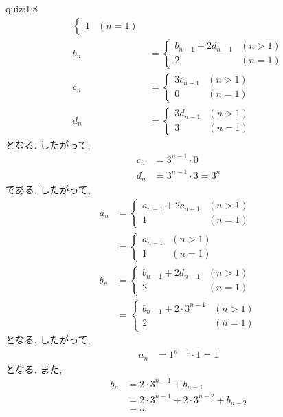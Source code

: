 \begin{answerof}{quiz:1:8}
\begin{align*}
\begin{cases}
      1&(n=1)
    \end{cases}\\
    b_n&=
    \begin{cases}
      b_{n-1}+2d_{n-1}&(n>1)\\
      2&(n=1)
    \end{cases}\\
    c_n&=
    \begin{cases}
      3c_{n-1}&(n>1)\\
      0&(n=1)
    \end{cases}\\
    d_n&=
    \begin{cases}
      3d_{n-1}&(n>1)\\
      3&(n=1)
    \end{cases}
  \end{align*}
  となる. したがって,
  \begin{align*}
    c_n&=3^{n-1}\cdot 0\\
    d_n&=3^{n-1}\cdot 3=3^n
  \end{align*}
  である.
  したがって,
  \begin{align*}
    a_n&=
    \begin{cases}
      a_{n-1}+2c_{n-1} &(n>1)\\
      1&(n=1)
    \end{cases}\\
    &=
    \begin{cases}
      a_{n-1} &(n>1)\\
      1&(n=1)
    \end{cases}\\
    b_n&=
    \begin{cases}
      b_{n-1}+2d_{n-1}&(n>1)\\
      2&(n=1)
    \end{cases}\\
  &=
    \begin{cases}
      b_{n-1}+2\cdot 3^{n-1}&(n>1)\\
      2&(n=1)
    \end{cases}
  \end{align*}
  となる.
  したがって,
  \begin{align*}
    a_n&=1^{n-1}\cdot 1=1
  \end{align*}
  となる. また,
  \begin{align*}
    b_n
    &=2\cdot 3^{n-1}+b_{n-1}\\
    &=2\cdot 3^{n-1}+2\cdot 3^{n-2}+b_{n-2}\\
    &=\cdots\\

\end{align*}
\end{answerof}
